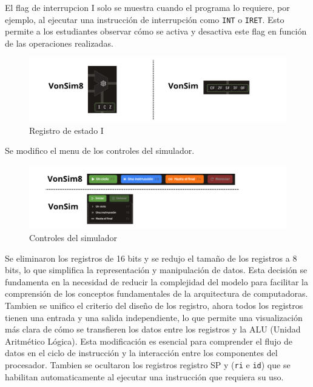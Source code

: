 \documentclass[12pt,oneside]{templates/unerthesis}
\begin{document}
El flag de interrupcion I solo se muestra cuando el programa lo requiere, por ejemplo, al ejecutar una instrucción de interrupción como \texttt{INT} o \texttt{IRET}. Esto permite a los estudiantes observar cómo se activa y desactiva este flag en función de las operaciones realizadas.

\begin{figure}

{\centering \includegraphics[width=0.85\linewidth]{images/flagi} 

}

\caption{Registro de estado I}\label{fig:banderaI}
\end{figure}

Se modifico el menu de los controles del simulador.

\begin{figure}

{\centering \includegraphics[width=0.85\linewidth]{images/controles} 

}

\caption{Controles del simulador}\label{fig:controles}
\end{figure}

Se eliminaron los registros de 16 bits y se redujo el tamaño de los registros a 8 bits, lo que simplifica la representación y manipulación de datos. Esta decisión se fundamenta en la necesidad de reducir la complejidad del modelo para facilitar la comprensión de los conceptos fundamentales de la arquitectura de computadoras. Tambien se unifico el criterio del diseño de los registro, ahora todos los registros tienen una entrada y una salida independiente, lo que permite una visualización más clara de cómo se transfieren los datos entre los registros y la ALU (Unidad Aritmético Lógica). Esta modificación es esencial para comprender el flujo de datos en el ciclo de instrucción y la interacción entre los componentes del procesador. Tambien se ocultaron los registros registro SP y (\texttt{ri} e \texttt{id}) que se habilitan automaticamente al ejecutar una instrucción que requiera su uso.
\end{document}
